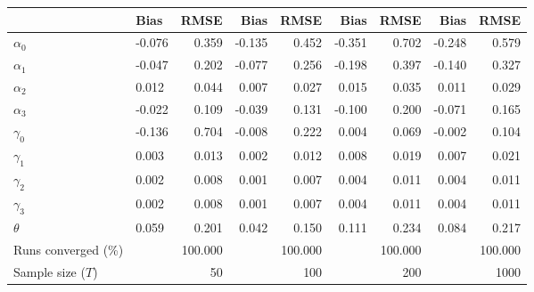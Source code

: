 
\begin{tabular}[t]{llrrrrrrr}
\toprule
  & Bias & RMSE & Bias & RMSE & Bias & RMSE & Bias & RMSE\\
\midrule
$\alpha_{0}$ & -0.076 & 0.359 & -0.135 & 0.452 & -0.351 & 0.702 & -0.248 & 0.579\\
$\alpha_{1}$ & -0.047 & 0.202 & -0.077 & 0.256 & -0.198 & 0.397 & -0.140 & 0.327\\
$\alpha_{2}$ & 0.012 & 0.044 & 0.007 & 0.027 & 0.015 & 0.035 & 0.011 & 0.029\\
$\alpha_{3}$ & -0.022 & 0.109 & -0.039 & 0.131 & -0.100 & 0.200 & -0.071 & 0.165\\
$\gamma_{0}$ & -0.136 & 0.704 & -0.008 & 0.222 & 0.004 & 0.069 & -0.002 & 0.104\\
$\gamma_{1}$ & 0.003 & 0.013 & 0.002 & 0.012 & 0.008 & 0.019 & 0.007 & 0.021\\
$\gamma_{2}$ & 0.002 & 0.008 & 0.001 & 0.007 & 0.004 & 0.011 & 0.004 & 0.011\\
$\gamma_{3}$ & 0.002 & 0.008 & 0.001 & 0.007 & 0.004 & 0.011 & 0.004 & 0.011\\
$\theta$ & 0.059 & 0.201 & 0.042 & 0.150 & 0.111 & 0.234 & 0.084 & 0.217\\
Runs converged (\%) &  & 100.000 &  & 100.000 &  & 100.000 &  & 100.000\\
Sample size ($T$) &  & 50 &  & 100 &  & 200 &  & 1000\\
\bottomrule
\end{tabular}
